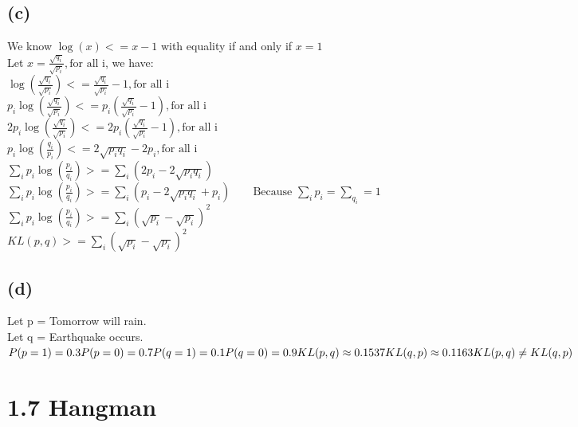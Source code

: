 \documentclass [11pt, a4paper, oneside] {article}
\begin{document}
\subsection *{(c)}
We know $\log(x) <= x -1$ with equality if and only if $x = 1$\\
Let $ x = \frac{\sqrt{q_i}}{\sqrt{p_i}},\textrm{for all i}$, we have:\\
$\log(\frac{\sqrt{q_i}}{\sqrt{p_i}}) <= \frac{\sqrt{q_i}}{\sqrt{p_i}} - 1,  \textrm{for all i}$\\
$p_i\log(\frac{\sqrt{q_i}}{\sqrt{p_i}}) <= p_i(\frac{\sqrt{q_i}}{\sqrt{p_i}} - 1),  \textrm{for all i}$\\
$2p_i\log(\frac{\sqrt{q_i}}{\sqrt{p_i}}) <= 2p_i(\frac{\sqrt{q_i}}{\sqrt{p_i}} - 1),  \textrm{for all i}$\\
$p_i\log(\frac{q_i}{p_i}) <= 2\sqrt{p_i q_i} - 2p_i,  \textrm{for all i}$\\
$\sum_ip_i\log(\frac{p_i}{q_i}) >=  \sum_i(2p_i - 2\sqrt{p_i q_i})$\\
$\sum_ip_i\log(\frac{p_i}{q_i}) >=  \sum_i(p_i - 2\sqrt{p_i q_i} + p_i)\qquad\textrm{Because } \sum_i{p_i} = \sum_{q_i} = 1$\\
$\sum_ip_i\log(\frac{p_i}{q_i}) >=  \sum_i(\sqrt{p_i} - \sqrt{p_i})^2$\\
$KL(p, q) >=  \sum_i(\sqrt{p_i} - \sqrt{p_i})^2$\\
\subsection *{(d)}
Let p = Tomorrow will rain.\\
Let q = Earthquake occurs.\\
$
P(p = 1) = 0.3\\
P(p = 0) = 0.7\\
P(q = 1) = 0.1\\
P(q = 0) = 0.9\\
KL(p, q) \approx 0.1537 \\
KL(q, p) \approx 0.1163 \\
KL(p, q) \neq KL(q, p) \\
$
\section *{1.7 Hangman}
\end{document}

